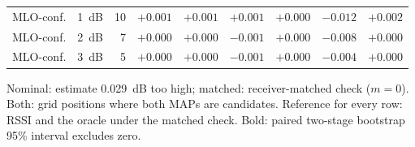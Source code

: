 \begin{table}[t]
\begin{tabular}{llrrrrrrr}
MLO-conf. & 1~dB & 10 & $+0.001$ & $+0.001$ & $+0.001$ & $+0.000$ & $\mathbf{-0.012}$ & $+0.002$ \\
MLO-conf. & 2~dB & 7 & $+0.000$ & $+0.000$ & $-0.001$ & $+0.000$ & $\mathbf{-0.008}$ & $+0.000$ \\
MLO-conf. & 3~dB & 5 & $+0.000$ & $+0.000$ & $-0.001$ & $+0.000$ & $\mathbf{-0.004}$ & $+0.000$ \\
\bottomrule
\end{tabular}
\par\smallskip\footnotesize Nominal: estimate 0.029~dB too high; matched: receiver-matched check ($m = 0$). Both: grid positions where both MAPs are candidates. Reference for every row: RSSI and the oracle under the matched check. Bold: paired two-stage bootstrap 95\% interval excludes zero.
\end{table}
